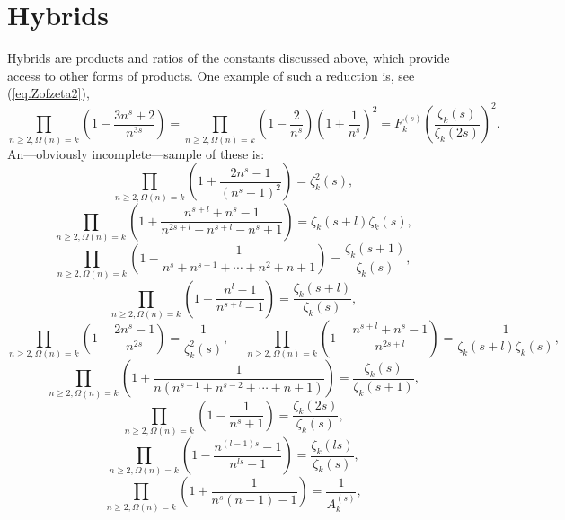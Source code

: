 \documentclass{amsart}
\begin{document}
\appendix
\section{Hybrids}\label{sec.hybr}
Hybrids are products and ratios of the constants discussed above, which
provide access to other forms of products. One example of such a
reduction is, see  (\ref{eq.Zofzeta2}),
\begin{equation}
\prod_{n\ge 2,\Omega(n)=k} \left( 1-\frac{3n^s+2}{n^{3s}}\right)
=
\prod_{n\ge 2,\Omega(n)=k} \left( 1-\frac{2}{n^s}\right)
\left( 1+\frac{1}{n^s}\right)^2
=
F_k^{(s)}\left( \frac{\zeta_k(s)}{\zeta_k(2s)}\right)^2.
\end{equation}
An---obviously incomplete---sample of these is:
\begin{equation}
\prod_{n\ge 2,\Omega(n)=k}
\left( 1+\frac{2n^s-1}{(n^s-1)^2}\right)
=
\zeta_k^2(s),
\end{equation}
\begin{equation}
\prod_{n\ge 2,\Omega(n)=k}
\left( 1+\frac{n^{s+l}+n^s-1}{n^{2s+l}-n^{s+l}-n^s+1}\right)
=
\zeta_k(s+l)\zeta_k(s),
\end{equation}
\begin{equation}
\prod_{n\ge 2,\Omega(n)=k}
\left( 1-\frac{1}{n^s+n^{s-1}+\cdots +n^2+n+1}\right)
=
\frac{\zeta_k(s+1)}{\zeta_k(s)},
\end{equation}
\begin{equation}
\prod_{n\ge 2,\Omega(n)=k}
\left( 1-\frac{n^l-1}{n^{s+l}-1}\right)
=
\frac{\zeta_k(s+l)}{\zeta_k(s)},
\end{equation}
\begin{equation}
\prod_{n\ge 2,\Omega(n)=k}
\left( 1-\frac{2n^s-1}{n^{2s}}\right)
=
\frac{1}{\zeta_k^2(s)},
\;\quad
\prod_{n\ge 2,\Omega(n)=k}
\left( 1-\frac{n^{s+l}+n^s-1}{n^{2s+l}}\right)
=
\frac{1}{\zeta_k(s+l)\zeta_k(s)},
\end{equation}
\begin{equation}
\prod_{n\ge 2,\Omega(n)=k}
\left( 1+\frac{1}{n(n^{s-1}+n^{s-2}+\cdots +n+1)}\right)
=
\frac{\zeta_k(s)}{\zeta_k(s+1)},
\end{equation}
\begin{equation}
\prod_{n\ge 2,\Omega(n)=k}
\left( 1-\frac{1}{n^s+1}\right)
=
\frac{\zeta_k(2s)}{\zeta_k(s)},
\end{equation}
\begin{equation}
\prod_{n\ge 2,\Omega(n)=k}
\left( 1-\frac{n^{(l-1)s}-1}{n^{ls}-1}\right)
=
\frac{\zeta_k(ls)}{\zeta_k(s)},
\end{equation}
\begin{equation}
\prod_{n\ge 2,\Omega(n)=k}
\left( 1+\frac{1}{n^s(n-1)-1}\right)
=
\frac{1}{ A_k^{(s)}},
\end{equation}
\end{document}
